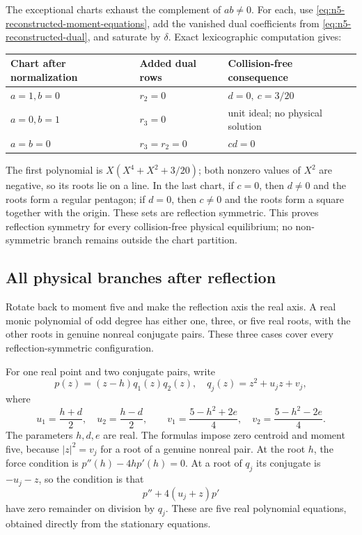 \documentclass[11pt]{article}
\theoremstyle{remark}
\numberwithin{equation}{section}
\begin{document}
The exceptional charts exhaust the complement of $ab\ne0$. For each,
use \eqref{eq:n5-reconstructed-moment-equations}, add the vanished
dual coefficients from \eqref{eq:n5-reconstructed-dual}, and saturate
by $\delta$. Exact lexicographic computation gives:
\begin{center}
\begin{tabular}{lll}
\toprule
Chart after normalization&Added dual rows&Collision-free consequence\\
\midrule
$a=1,b=0$&$r_2=0$&$d=0,\ c=3/20$\\
$a=0,b=1$&$r_3=0$&unit ideal; no physical solution\\
$a=b=0$&$r_3=r_2=0$&$cd=0$\\
\bottomrule
\end{tabular}
\end{center}
The first polynomial is $X(X^4+X^2+3/20)$; both nonzero values of
$X^2$ are negative, so its roots lie on a line. In the last chart,
if $c=0$, then $d\ne0$ and the roots form a regular pentagon; if
$d=0$, then $c\ne0$ and the roots form a square together with the
origin. These sets are reflection symmetric. This proves reflection
symmetry for every collision-free physical equilibrium; no
non-symmetric branch remains outside the chart partition.

\subsection{All physical branches after reflection}
Rotate back to moment five and make the reflection axis the real axis.
A real monic polynomial of odd degree has either one, three, or five
real roots, with the other roots in genuine nonreal conjugate pairs.
These three cases cover every reflection-symmetric configuration.

For one real point and two conjugate pairs, write
\[
 p(z)=(z-h)q_1(z)q_2(z),\quad
 q_j(z)=z^2+u_jz+v_j,
\]
where
\[
 u_1=\frac{h+d}{2},\quad u_2=\frac{h-d}{2},\qquad
 v_1=\frac{5-h^2+2e}{4},\quad v_2=\frac{5-h^2-2e}{4}.
\]
The parameters $h,d,e$ are real. The formulas impose zero centroid
and moment five, because $|z|^2=v_j$ for a root of a genuine
nonreal pair. At the root $h$, the force condition is
$p''(h)-4hp'(h)=0$. At a root of $q_j$ its conjugate is $-u_j-z$,
so the condition is that
\begin{equation}\label{eq:n5-reconstructed-remainders}
 p''+4(u_j+z)p'
\end{equation}
have zero remainder on division by $q_j$. These are five real
polynomial equations, obtained directly from the stationary equations.
\end{document}
